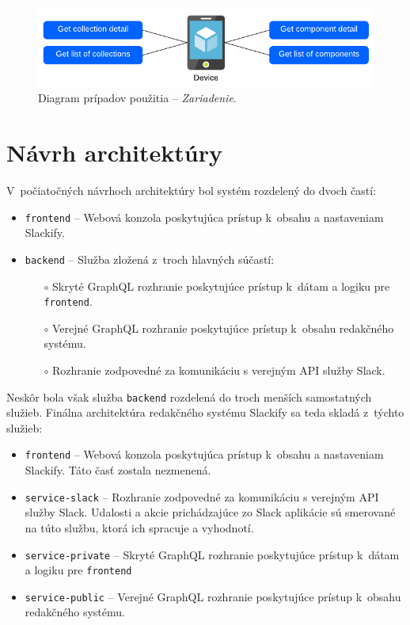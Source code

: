 \begin{figure}[h]
	\centering
	\includegraphics[scale=0.9]{obrazky-figures/device_use_case}
	\caption{Diagram prípadov použitia -- \emph{Zariadenie}.}
\end{figure}

\pagebreak

\section{Návrh architektúry}
\label{design:architecture}
V~počiatočných návrhoch architektúry bol systém rozdelený do dvoch častí:

\begin{itemize}
	\item \texttt{frontend} -- Webová konzola poskytujúca prístup k~obsahu a nastaveniam Slackify.
	\item \texttt{backend} -- Služba zložená z~troch hlavných súčastí:
		\begin{itemize}
			\item[$\circ$] Skryté GraphQL rozhranie poskytujúce prístup k~dátam a logiku pre \texttt{frontend}.
			\item[$\circ$] Verejné GraphQL rozhranie poskytujúce prístup k~obsahu redakčného systému.
			\item[$\circ$] Rozhranie zodpovedné za komunikáciu s verejným API služby Slack.
		\end{itemize}
\end{itemize}

\noindent Neskôr bola však služba \texttt{backend} rozdelená do troch menších samostatných služieb. Finálna architektúra redakčného systému Slackify sa teda skladá z~týchto služieb:

\begin{itemize}
	\item \texttt{frontend} -- Webová konzola poskytujúca prístup k~obsahu a nastaveniam Slackify. Táto časť zostala nezmenená.
	\item \texttt{service-slack} -- Rozhranie zodpovedné za komunikáciu s verejným API služby Slack. Udalosti a akcie prichádzajúce zo Slack aplikácie sú smerované na túto službu, ktorá ich spracuje a vyhodnotí.
	\item \texttt{service-private} -- Skryté GraphQL rozhranie poskytujúce prístup k~dátam a logiku pre \texttt{frontend}
	\item \texttt{service-public} -- Verejné GraphQL rozhranie poskytujúce prístup k~obsahu redakčného systému.
\end{itemize}

